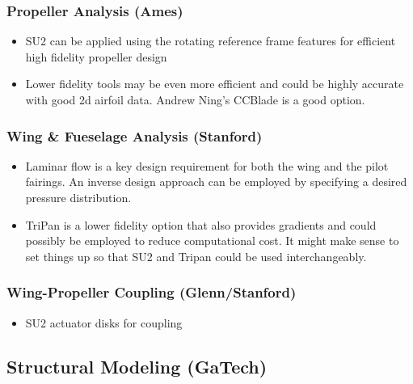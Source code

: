 \documentclass[]{aiaa-tc}
\begin{document}
    \subsubsection{Propeller Analysis (Ames)}
        \begin{itemize}
            \item SU2 can be applied using the rotating reference frame features for efficient high fidelity propeller design
            \item Lower fidelity tools may be even more efficient and could be highly accurate with good 2d airfoil data. Andrew Ning's 
            CCBlade is a good option. 
        \end{itemize}

    \subsubsection{Wing \& Fueselage Analysis (Stanford)}
        \begin{itemize}
            \item Laminar flow is a key design requirement for both the wing and the pilot fairings. An inverse design approach can be employed 
            by specifying a desired pressure distribution. 
            \item TriPan is a lower fidelity option that also provides gradients and could possibly be employed to reduce computational cost. It might make sense to set things up so that SU2 and Tripan could be used interchangeably. 
        \end{itemize}

    \subsubsection{Wing-Propeller Coupling (Glenn/Stanford)}
        \begin{itemize}
            \item SU2 actuator disks for coupling
        \end{itemize}

        \subsection{Structural Modeling (GaTech)}
\end{document}
